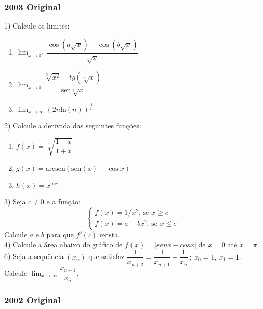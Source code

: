 \documentclass[12pt,a4paper]{article}
\newcommand{\sen}{\mathrm{sen}}
\newcommand{\original}[1]{\tiny \href{#1}{Original} \normalsize}
\begin{document}
\newpage

\subsubsection{2003 \original{https://drive.google.com/open?id=1HM9q4TJG9IX1hN_5smiDRbjzq2JZucgM}}


1) Calcule os limites:
\begin{enumerate}[label=\alph*)]
\item $\displaystyle{\lim_{x \to 0^+}} \dfrac{\cos{(a\sqrt{x})}-\cos{(b\sqrt{x})}}{\sqrt{x}}$
\item $\displaystyle{\lim_{x \to 0}}\dfrac{\sqrt[3]{x^2}-tg(\sqrt[3]{x})}{\sen{\sqrt[3]{x}}}$
\item $\displaystyle{\lim_{x \to \infty}}(2n\textrm{ln}(n))^{\frac{1}{2n}}
$ \\
\end{enumerate}

2) Calcule a derivada das seguintes funções:

\begin{enumerate}[label=\alph*)]
\item $f(x)=\sqrt[3]{\dfrac{1-x}{1+x}}$
\item $g(x)=\textrm{arcsen}(\sen{(x)}-\cos{x})$
\item $h(x)=x^{\textrm{ln}x}$
\end{enumerate}

3) Seja $c\neq 0$ e a função: 
$$
\begin{cases}
f(x)=1/x^2\textrm{, se }x\geq c\\
f(x)=a+bx^2\textrm{, se }x\leq c
\end{cases}
$$
Calcule $a$ e $b$ para que $f'(c)$ exista.
\\

4) Calcule a área abaixo do gráfico de $f(x)=|senx-cosx|$ de $x=0$ até $x=\pi$.
\\

6) Seja a sequência $(x_n)$ que satisfaz $\dfrac{1
}{x_{n+2}}=\dfrac{1}{x_{n+1}}+\dfrac{1}{x_n} \ ; \ x_0=1, \ x_1=1$. Calcule $\displaystyle{\lim_{x\to \infty}}\dfrac{x_{n+1}}{x_n}$.

\newpage

\subsubsection{2002  \original{https://drive.google.com/open?id=1__NA61VldSD-MI9_8ujzrrdRjg_uC8ZS}}


\end{document}
